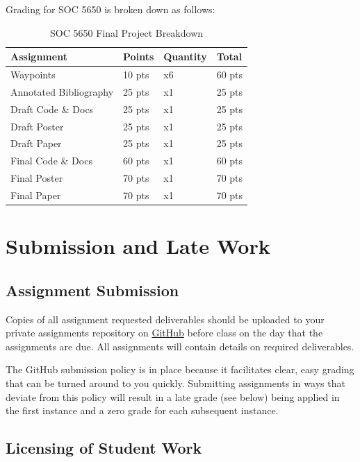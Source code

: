 \documentclass[]{book}
\begin{document}
Grading for SOC 5650 is broken down as follows:

\begin{table}

\caption{\label{tab:unnamed-chunk-6}SOC 5650 Final Project Breakdown}
\centering
\begin{tabular}[t]{llll}
\toprule
Assignment & Points & Quantity & Total\\
\midrule
Waypoints & 10 pts & x6 & 60 pts\\
Annotated Bibliography & 25 pts & x1 & 25 pts\\
Draft Code \& Docs & 25 pts & x1 & 25 pts\\
Draft Poster & 25 pts & x1 & 25 pts\\
Draft Paper & 25 pts & x1 & 25 pts\\
\addlinespace
Final Code \& Docs & 60 pts & x1 & 60 pts\\
Final Poster & 70 pts & x1 & 70 pts\\
Final Paper & 70 pts & x1 & 70 pts\\
\bottomrule
\end{tabular}
\end{table}

\hypertarget{submission-and-late-work}{%
\section{Submission and Late Work}\label{submission-and-late-work}}

\hypertarget{assignment-submission}{%
\subsection{Assignment Submission}\label{assignment-submission}}

Copies of all assignment requested deliverables should be uploaded to your private assignments repository on \href{https://github.com/slu-soc5650}{GitHub} before class on the day that the assignments are due. All assignments will contain details on required deliverables.

The GitHub submission policy is in place because it facilitates clear, easy grading that can be turned around to you quickly. Submitting assignments in ways that deviate from this policy will result in a late grade (see below) being applied in the first instance and a zero grade for each subsequent instance.

\hypertarget{licensing-of-student-work}{%
\subsection{Licensing of Student Work}\label{licensing-of-student-work}}
\end{document}
